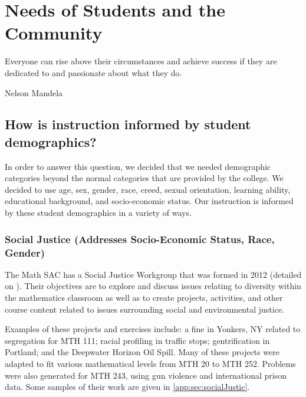 \chapter{Needs of Students and the Community}
\epigraph{Everyone can rise above their circumstances and achieve success if they are dedicated to and passionate about what they do.}{Nelson Mandela}

\section{How is instruction informed by student demographics?}
In order to answer this question, we decided that we needed demographic
categories beyond the normal categories that are provided by the college. We
decided to use age, sex, gender, race, creed, sexual orientation, learning
ability, educational background, and socio-economic status. Our instruction is
informed by these student demographics in a variety of ways.
\label{needs:sec:definitiondiversity}



\subsection{Social Justice (Addresses Socio-Economic Status, Race, Gender)}
The Math SAC has a Social Justice Workgroup that was formed in 2012 (detailed 
on ).  Their
objectives are to explore and discuss issues relating to diversity within the
mathematics classroom as well as to create projects, activities, and other
course content related to issues surrounding social and environmental justice.

Examples of these projects and exercises include: a fine in Yonkers, NY related
to segregation for MTH 111; racial profiling in traffic stops; gentrification
in Portland; and the Deepwater Horizon Oil Spill. Many of these projects were
adapted to fit various mathematical levels from MTH 20 to MTH 252. Problems
were also generated for MTH 243, using gun violence and international prison
data. Some samples of their work are given in \vref{app:sec:socialJustic}.

